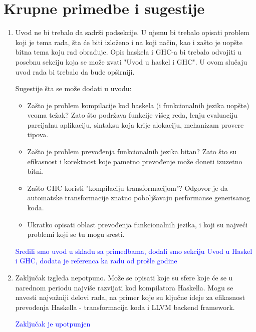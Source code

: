 \documentclass[a4paper]{report}
\newcommand{\odgovor}[1]{\textcolor{blue}{#1}}
\begin{document}
	\section{Krupne primedbe i sugestije}
	\begin{enumerate}  
		
		\item Uvod ne bi trebalo da sadrži podsekcije. U njemu bi trebalo opisati problem koji je tema rada, šta će biti izloženo i na koji način, kao i zašto je uopšte bitna tema koju rad obrađuje. Opis haskela i GHC-a bi trebalo odvojiti u posebnu sekciju koja se može zvati "Uvod u haskel i GHC". U ovom slučaju uvod rada bi trebalo da bude opširniji. 
		
		Sugestije šta se može dodati u uvodu:
		\begin{itemize}
			\item Zašto je problem kompilacije kod haskela (i funkcionalnih jezika uopšte) veoma težak? Zato što podržava funkcije višeg reda, lenju evaluaciju parcijalnu aplikaciju, sintaksu koja krije alokaciju, mehanizam provere tipova.
			
			\item Zašto je problem prevođenja funkcionalnih jezika bitan? Zato što su efikasnost i korektnost koje pametno prevođenje može doneti izuzetno bitni. 
			
			\item Zašto GHC koristi "kompilaciju transformacijom"? Odgovor je da automatske transformacije znatno poboljšavaju performanse generisanog koda.
			
			\item Ukratko opisati oblast prevođenja funkcionalnih jezika, i koji su najveći problemi koji se tu mogu sresti.
		\end{itemize}
		
		\odgovor{Sredili smo uvod u skladu sa primedbama, dodali smo sekciju Uvod u Haskel i GHC, dodata je referenca ka radu od prošle godine}
		
		
		\item Zaključak izgleda nepotpuno. Može se opisati koje su sfere koje će se u narednom periodu najviše razvijati kod kompilatora Haskella. Mogu se navesti najvažniji delovi rada, na primer koje su ključne ideje za efikasnost prevođenja Haskella - transformacija koda i LLVM backend framework.
		
		\odgovor{Zaključak je upotpunjen}
		

\end{enumerate}
\end{document}
